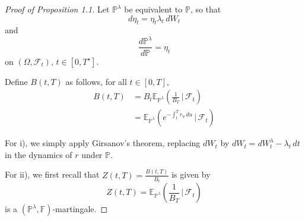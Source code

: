 \documentclass[10pt, oneside, reqno]{amsbook}
\theoremstyle{plain}%
\theoremstyle{definition}
\theoremstyle{rem}
\theoremstyle{definition}
\def \P {\ensuremath{\mathcal{P}}}
\newcommand{\given}{ \, | \,}
\newcommand{\sigf}{\mathcal{F}}
\newcommand{\E}{\mathbb{E}}
\renewcommand{\P}{\mathbb{P}}
\newcommand{\F}{\mathbb{F}}
\numberwithin{equation}{chapter}
\begin{document}
\begin{proof}[Proof of Proposition 1.1]
    Let $\P^\lambda$ be equivalent to $\P$, so that \[
        d\eta_t = \eta_t \lambda_t \, dW_t
    \]  and \[
        \frac{d\P^\lambda}{d \P} = \eta_t
    \] on $(\Omega, \sigf_t)$, $t \in [0, T^\star]$.

    Define $B(t, T)$ as follows, for all $t \in [0, T]$, \begin{align*}
        B(t, T) &= B_t \E_{\P^\lambda} \left( \frac{1}{B_T} \given \sigf_t \right) \\
        &= \E_{\P^\lambda} \left(e^{-\int_t^T r_u \, du} \given \sigf_t \right)
    \end{align*}
    
    For i), we simply apply Girsanov's theorem, replacing $dW_t$ by $dW_t = dW^\lambda_t - \lambda_t \, dt$ in the dynamics of $r$ under $\P$.  
    
    For ii), we first recall that $Z(t, T) = \frac{B(t, T)}{B_t}$ is given by \[
        Z(t, T) = \E_{\P^\lambda} \left( \frac{1}{B_T} \given \sigf_t \right)
    \] is a $(\P^\lambda, \F)$-martingale.
    

\end{proof}
\end{document}
